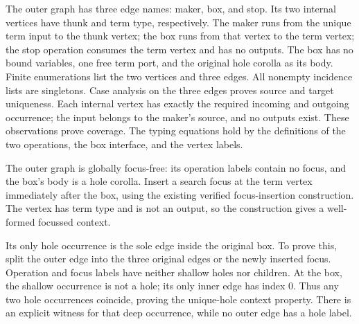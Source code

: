 The outer graph has three edge names: maker, box, and stop. Its two
internal vertices have thunk and term type, respectively. The maker
runs from the unique term input to the thunk vertex; the box runs from
that vertex to the term vertex; the stop operation consumes the term
vertex and has no outputs. The box has no bound variables, one free
term port, and the original hole corolla as its body.
Finite enumerations list the two vertices and three edges.
All nonempty incidence lists are singletons. Case analysis on the
three edges proves source and target uniqueness. Each internal vertex
has exactly the required incoming and outgoing occurrence; the input
belongs to the maker's source, and no outputs exist. These observations
prove coverage. The typing equations hold by the definitions of the
two operations, the box interface, and the vertex labels.

The outer graph is globally focus-free: its operation labels contain
no focus, and the box's body is a hole corolla. Insert a search focus
at the term vertex immediately after the box, using the existing
verified focus-insertion construction. The vertex has term type and
is not an output, so the construction gives a well-formed focussed
context.

Its only hole occurrence is the sole edge inside the original box.
To prove this, split the outer edge into the three original edges or
the newly inserted focus. Operation and focus labels have neither
shallow holes nor children. At the box, the shallow occurrence is
not a hole; its only inner edge has index $0$. Thus any two hole
occurrences coincide, proving the unique-hole context property.
There is an explicit witness for that deep occurrence, while no
outer edge has a hole label.


